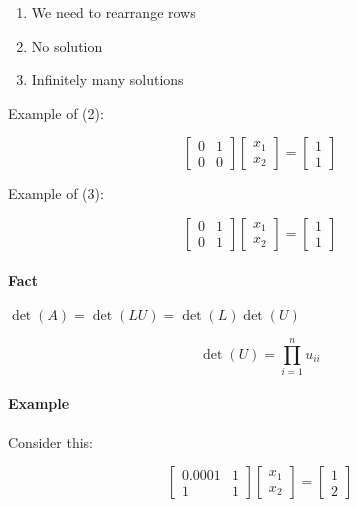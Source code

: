 \documentclass[12pt]{article}
\newcommand{\<}{\langle}
\renewcommand{\>}{\rangle}
\begin{document}
\begin{enumerate}
	\item We need to rearrange rows
	\item No solution
	\item Infinitely many solutions
\end{enumerate}

Example of (2):

\[
	\begin{bmatrix}
		0 & 1 \\ 0 & 0
	\end{bmatrix}
	\begin{bmatrix}
		x_1 \\ x_2
	\end{bmatrix} = 
	\begin{bmatrix}
		1 \\ 1
	\end{bmatrix}
\]

Example of (3):

\[
	\begin{bmatrix}
		0 & 1 \\ 0 & 1
	\end{bmatrix}
	\begin{bmatrix}
		x_1 \\ x_2
	\end{bmatrix} = 
	\begin{bmatrix}
		1 \\ 1
	\end{bmatrix}
\]

\paragraph{Fact} $\det(A) = \det(LU) = \det(L)\det(U)$

\[
	\det(U) = \prod_{i=1}^n u_{ii}
\]

\paragraph{Example} Consider this:

\[
	\begin{bmatrix}
		0.0001 & 1 \\ 1 & 1
	\end{bmatrix}
	\begin{bmatrix}
		x_1 \\ x_2
	\end{bmatrix} = 
	\begin{bmatrix}
		1 \\ 2
	\end{bmatrix}
\]
\end{document}
